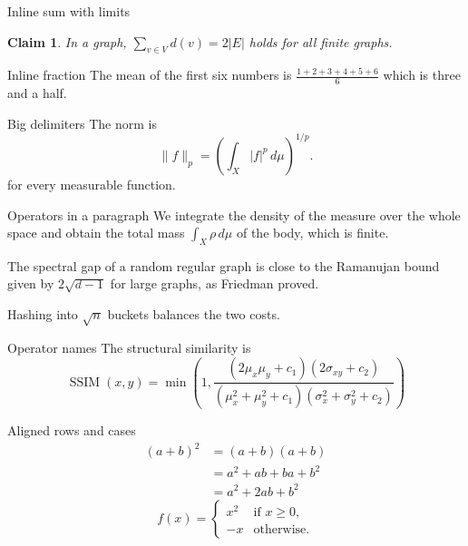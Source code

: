 \documentclass{beamer}
\DeclareMathOperator{\SSIM}{SSIM}
\newtheorem{claim}{Claim}
\begin{document}
\begin{frame}{Inline sum with limits}
\begin{claim}
In a graph, $\sum\limits_{v \in V} d(v) = 2|E|$ holds for all finite graphs.
\end{claim}
\end{frame}

\begin{frame}{Inline fraction}
The mean of the first six numbers is $\frac{1+2+3+4+5+6}{6}$ which is three and a half.
\end{frame}

\begin{frame}{Big delimiters}
The norm is
\[ \|f\|_p = \left( \int_X |f|^p \, d\mu \right)^{1/p}. \]
for every measurable function.
\end{frame}

\begin{frame}{Operators in a paragraph}
We integrate the density of the measure over the whole space and obtain the total mass
$\displaystyle\int_X \rho \, d\mu$ of the body, which is finite.

The spectral gap of a random regular graph is close to the Ramanujan bound given by
$2\sqrt{d-1}$ for large graphs, as Friedman proved.

Hashing into $\sqrt{n}$ buckets balances the two costs.
\end{frame}

\begin{frame}{Operator names}
The structural similarity is
\[ \SSIM(x, y) = \min\left(1, \frac{(2\mu_x\mu_y + c_1)(2\sigma_{xy} + c_2)}{(\mu_x^2 + \mu_y^2 + c_1)(\sigma_x^2 + \sigma_y^2 + c_2)}\right) \]
\end{frame}

\begin{frame}{Aligned rows and cases}
\begin{align*}
(a + b)^2 &= (a + b)(a + b) \\
&= a^2 + ab + ba + b^2 \\
&= a^2 + 2ab + b^2
\end{align*}
\[ f(x) = \begin{cases} x^2 & \text{if } x \ge 0, \\ -x & \text{otherwise.} \end{cases} \]
\end{frame}
\end{document}
